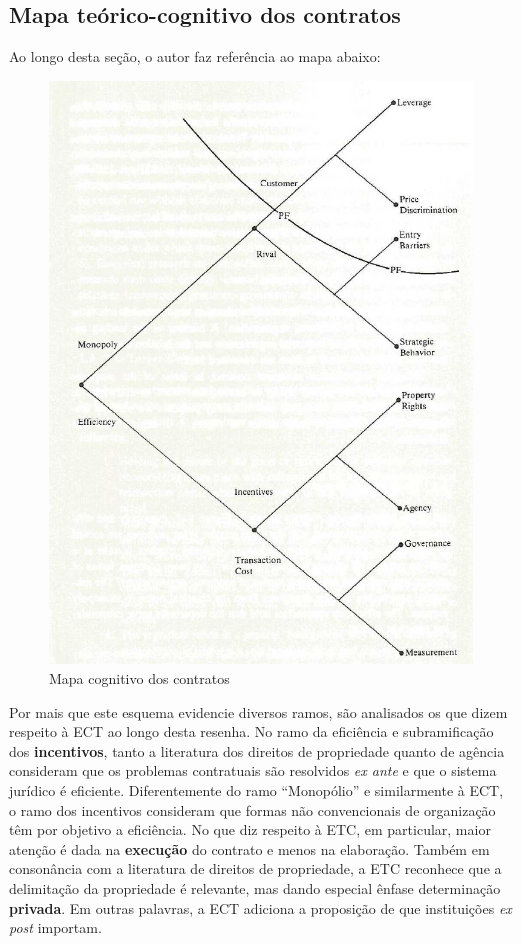\subsection*{Mapa teórico-cognitivo dos contratos}

Ao longo desta seção, o autor faz referência ao mapa abaixo:

\begin{figure}[H]
	\centering
	\caption{Mapa cognitivo dos contratos}
	\label{fig:screenshot001}
	\includegraphics[width=0.7\linewidth]{screenshot001}
\end{figure}

Por mais que este esquema evidencie diversos ramos, são analisados os que dizem respeito à ECT ao longo desta resenha.
No ramo da eficiência e subramificação dos \textbf{incentivos}, tanto a literatura dos direitos de propriedade quanto de agência consideram que os problemas contratuais são resolvidos \textit{ex ante} e que o sistema jurídico é eficiente. Diferentemente do ramo ``Monopólio'' e similarmente à ECT, o ramo dos incentivos consideram que formas não convencionais de organização têm por objetivo a eficiência. No que diz respeito à ETC, em particular, maior atenção é dada na \textbf{execução} do contrato e menos na elaboração. Também em consonância com a literatura de direitos de propriedade, a ETC reconhece que a delimitação da propriedade é relevante, mas dando especial ênfase determinação \textbf{privada}. Em outras palavras, a ECT adiciona a proposição de que instituições \textit{ex post} importam.

